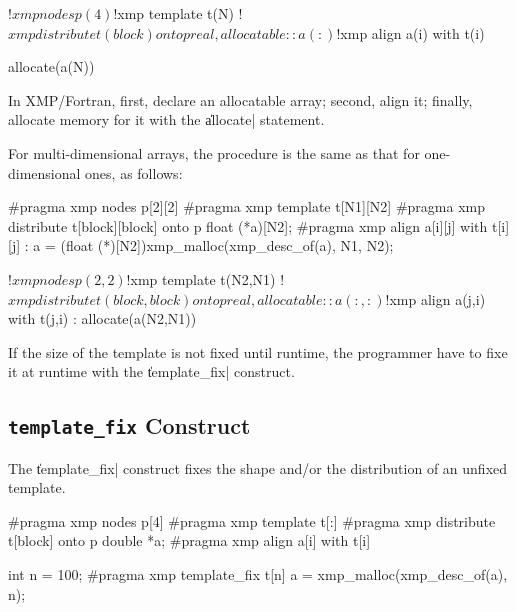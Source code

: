 \begin{XFexample}
!$xmp nodes p(4)
!$xmp template t(N)
!$xmp distribute t(block) onto p
real, allocatable :: a(:)
!$xmp align a(i) with t(i)

allocate(a(N))
\end{XFexample}

In XMP/Fortran, first, declare an allocatable array; second, align it;
finally, allocate memory for it with the \|allocate| statement.


For multi-dimensional arrays, the procedure is the same as that for 
one-dimensional ones, as follows:

\begin{XCexample}
#pragma xmp nodes p[2][2]
#pragma xmp template t[N1][N2]
#pragma xmp distribute t[block][block] onto p
float (*a)[N2];
#pragma xmp align a[i][j] with t[i][j]
  :
a = (float (*)[N2])xmp_malloc(xmp_desc_of(a), N1, N2);
\end{XCexample}

\begin{XFexample}
!$xmp nodes p(2,2)
!$xmp template t(N2,N1)
!$xmp distribute t(block,block) onto p
real, allocatable :: a(:,:)
!$xmp align a(j,i) with t(j,i)
  :
allocate(a(N2,N1))
\end{XFexample}

\begin{mynote}
  If the size of the template is not fixed until runtime, the programmer
  have to fixe it at runtime with the \|template_fix| construct.
\end{mynote}


\subsection{{\tt template\_fix} Construct}
\label{184243_1Nov19}

The \|template_fix| construct fixes the shape and/or the distribution of
an unfixed template. 

\begin{XCexample}
#pragma xmp nodes p[4]
#pragma xmp template t[:]
#pragma xmp distribute t[block] onto p
double *a;
#pragma xmp align a[i] with t[i]

int n = 100;
#pragma xmp template_fix t[n]
a = xmp_malloc(xmp_desc_of(a), n);
\end{XCexample}

